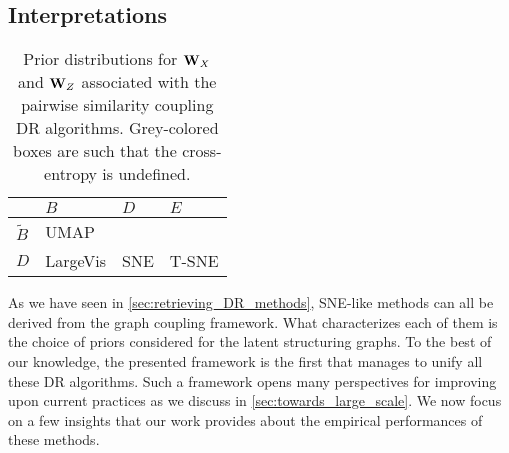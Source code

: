 \subsection{Interpretations}\label{sec:interpretations}

\begin{table}[]
    \caption{Prior distributions for ${\mathbf{W}}_{X}$ and ${\mathbf{W}}_{Z}$ associated with the pairwise similarity coupling DR algorithms. Grey-colored boxes are such that the cross-entropy is undefined.}
    \begin{center}
    \begin{small}
    \begin{sc}
    \centering
    \renewcommand{\arraystretch}{2}
    \begin{NiceTabular}{|W{c}{1cm}|W{c}{1.8cm}|W{c}{1.8cm}|W{c}{1.8cm}|}
    \hline
     & $B$ & $D$ & $E$ \\
    \hline
    $\widetilde{B}$ & UMAP &  &  \\
    \hline
    $D$ & LargeVis & SNE & T-SNE\\
    \hline
    \end{NiceTabular}
    \label{tableau_priors}
    \end{sc}
    \end{small}
    \end{center}
    \label{priors_methods}
\end{table}

As we have seen in \cref{sec:retrieving_DR_methods}, SNE-like methods can all be derived from the graph coupling framework.  What characterizes each of them is the choice of priors considered for the latent structuring graphs. To the best of our knowledge, the presented framework is the first that manages to unify all these DR algorithms. Such a framework opens many perspectives for improving upon current practices as we discuss in \cref{sec:towards_large_scale}. 
We now focus on a few insights that our work provides about the empirical performances of these methods. 

